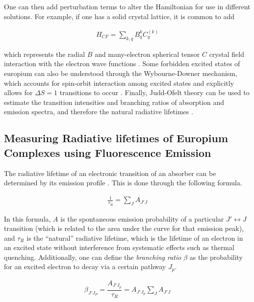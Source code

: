 One can then add perturbation terms to alter the Hamiltonian for use in
different solutions. For example, if one has a solid crystal lattice, it is
common to add

\begin{align*}
  H_{CF} = \sum_{k,q} B_q^k C_q^{(k)}
\end{align*}

which represents the radial $B$ and many-electron spherical tensor $C$ crystal
field interaction with the electron wave functions \cite{Peijzel:2005jh}.  Some
forbidden excited states of europium can also be understood through the
Wybourne-Downer mechanism, which accounts for spin-orbit interaction among
excited states and explicitly allows for $\Delta S = 1$ transitions to occur
\cite{Wybourne:1968ez,Downer:1988kz}.  Finally, Judd-Ofelt theory can be used
to estimate the transition intensities and branching ratios of absorption and
emission spectra, and therefore the natural radiative lifetimes
\cite{Werts:2002fs}.



\subsection{Measuring Radiative lifetimes of Europium Complexes using Fluorescence Emission}\label{subsec:rad_life}

The radiative lifetime of an electronic transition of an absorber can be
determined by its emission profile \cite{Werts:2002fs}. This is done through
the following formula.

\begin{align}
  \frac{1}{\tau_R} = \sum_JA_{J'J}\label{eq:nat_life_emiss}
\end{align}

In this formula, $A$ is the spontaneous emission probability of a particular
$J' \leftrightarrow J$ transition (which is related to the area under the curve for that
emission peak), and $\tau_R$ is the ``natural'' radiative lifetime, which is
the lifetime of an electron in an excited state without interference from
systematic effects such as thermal quenching. Additionally, one can define the
\emph{branching ratio} $\beta$ as the probability for an excited electron to
decay via a certain pathway $J_p$.

\begin{align}
  \beta_{J'J_P} = \dfrac{A_{J'J_p}}{\tau_R} = A_{J'J_p}\sum_J A_{J'J} \label{eq:branch_ratio}
\end{align}

